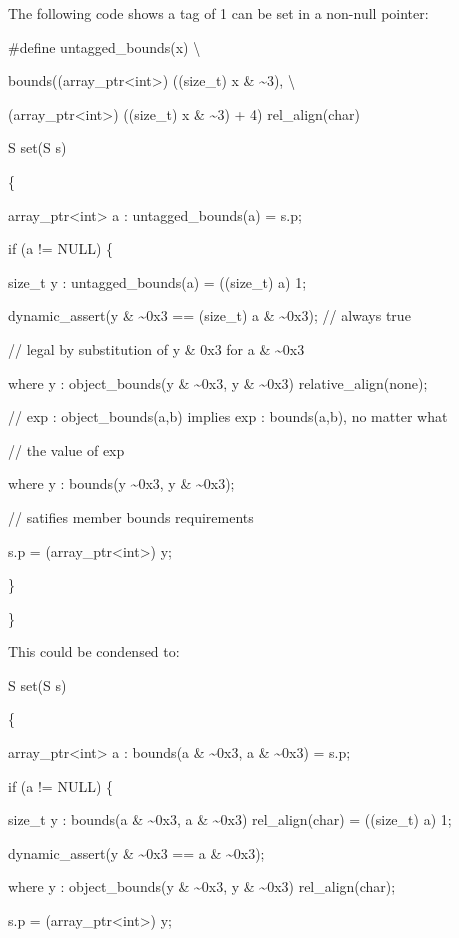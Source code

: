 \documentclass[]{article}
\begin{document}
The following code shows a tag of 1 can be set in a non-null pointer:

\#define untagged\_bounds(x) \textbackslash{}

bounds((array\_ptr\textless{}int\textgreater{}) ((size\_t) x \&
\textasciitilde{}3), \textbackslash{}

(array\_ptr\textless{}int\textgreater{}) ((size\_t) x \&
\textasciitilde{}3) + 4) rel\_align(char)

S set(S s)

\{

array\_ptr\textless{}int\textgreater{} a : untagged\_bounds(a) = s.p;

if (a != NULL) \{

size\_t y : untagged\_bounds(a) = ((size\_t) a) \textbar{} 1;

dynamic\_assert(y \& \textasciitilde{}0x3 == (size\_t) a \&
\textasciitilde{}0x3); // always true

// legal by substitution of y \& 0x3 for a \& \textasciitilde{}0x3

where y : object\_bounds(y \& \textasciitilde{}0x3, y \&
\textasciitilde{}0x3) relative\_align(none);

// exp : object\_bounds(a,b) implies exp : bounds(a,b), no matter what

// the value of exp

where y : bounds(y \textasciitilde{}0x3, y \& \textasciitilde{}0x3);

// satifies member bounds requirements

s.p = (array\_ptr\textless{}int\textgreater{}) y;

\}

\}

This could be condensed to:

S set(S s)

\{

array\_ptr\textless{}int\textgreater{} a : bounds(a \&
\textasciitilde{}0x3, a \& \textasciitilde{}0x3) = s.p;

if (a != NULL) \{

size\_t y : bounds(a \& \textasciitilde{}0x3, a \& \textasciitilde{}0x3)
rel\_align(char) = ((size\_t) a) \textbar{} 1;

dynamic\_assert(y \& \textasciitilde{}0x3 == a \& \textasciitilde{}0x3);

where y : object\_bounds(y \& \textasciitilde{}0x3, y \&
\textasciitilde{}0x3) rel\_align(char);

s.p = (array\_ptr\textless{}int\textgreater{}) y;
\end{document}
